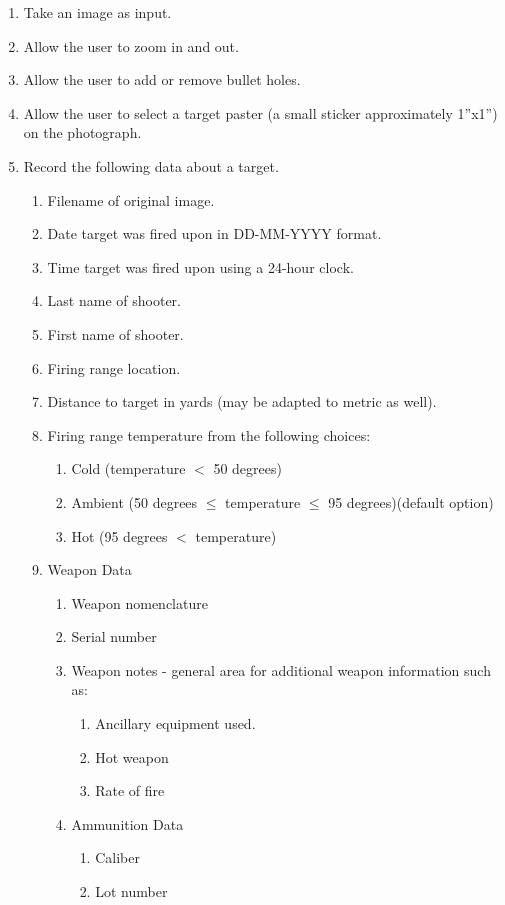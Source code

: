 \begin{enumerate}
	\item Take an image as input.
	\item Allow the user to zoom in and out.
	\item Allow the user to add or remove bullet holes.
	\item Allow the user to select a target paster (a small sticker approximately 1''x1'') on the photograph.
	\item Record the following data about a target.
	\begin{enumerate}
		\item Filename of original image.
		\item Date target was fired upon in DD-MM-YYYY format.
		\item Time target was fired upon using a 24-hour clock.
		\item Last name of shooter.
		\item First name of shooter.
		\item Firing range location.
		\item Distance to target in yards (may be adapted to metric as well).
		\item Firing range temperature from the following choices:
		\begin{enumerate}
			\item Cold (temperature $<$ 50 degrees)
			\item Ambient (50 degrees $\le$ temperature $\le$ 95 degrees)(default option)
			\item Hot (95 degrees $<$ temperature)
		\end{enumerate}
		\item Weapon Data
		\begin{enumerate}
			\item Weapon nomenclature
			\item Serial number
			\item Weapon notes - general area for additional weapon information such as:
			\begin{enumerate}
				\item Ancillary equipment used.
				\item Hot weapon
				\item Rate of fire
			\end{enumerate}
			\item Ammunition Data
			\begin{enumerate}
				\item Caliber
				\item Lot number

\end{enumerate}
\end{enumerate}
\end{enumerate}
\end{enumerate}
